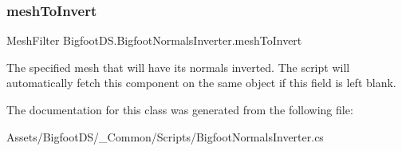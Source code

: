 \mbox{\label{class_bigfoot_d_s_1_1_bigfoot_normals_inverter_ae9f17ad0ec0cc214b044d8ee8f5c6ba7}} 
\subsubsection{\texorpdfstring{mesh\+To\+Invert}{meshToInvert}}
{\footnotesize\ttfamily Mesh\+Filter Bigfoot\+D\+S.\+Bigfoot\+Normals\+Inverter.\+mesh\+To\+Invert}



The specified mesh that will have its normals inverted. The script will automatically fetch this component on the same object if this field is left blank. 



The documentation for this class was generated from the following file\+:\begin{DoxyCompactItemize}
\item 
Assets/\+Bigfoot\+D\+S/\+\_\+\+Common/\+Scripts/Bigfoot\+Normals\+Inverter.\+cs\end{DoxyCompactItemize}
